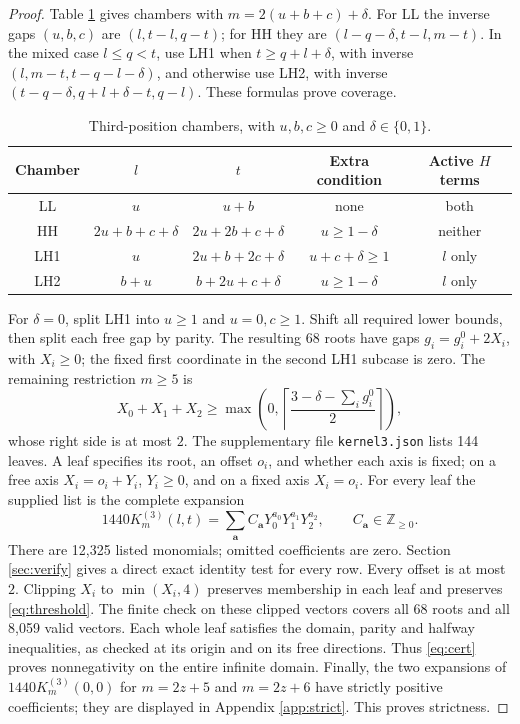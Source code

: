 \documentclass[11pt]{article}
\begin{document}
\begin{proof}
Table \ref{tab:k3} gives chambers with $m=2(u+b+c)+\delta$.
For LL the inverse gaps $(u,b,c)$ are $(l,t-l,q-t)$; for HH they are
$(l-q-\delta,t-l,m-t)$. In the mixed case $l\le q<t$, use LH1 when
$t\ge q+l+\delta$, with inverse $(l,m-t,t-q-l-\delta)$, and otherwise
use LH2, with inverse $(t-q-\delta,q+l+\delta-t,q-l)$.
These formulas prove coverage.
\begin{table}[ht]
\centering\small
\begin{tabular}{c c c c c}
\toprule
Chamber & $l$ & $t$ & Extra condition & Active $H$ terms\\\midrule
LL & $u$ & $u+b$ & none & both\\
HH & $2u+b+c+\delta$ & $2u+2b+c+\delta$ & $u\ge1-\delta$ & neither\\
LH1 & $u$ & $2u+b+2c+\delta$ & $u+c+\delta\ge1$ & $l$ only\\
LH2 & $b+u$ & $b+2u+c+\delta$ & $u\ge1-\delta$ & $l$ only\\\bottomrule
\end{tabular}
\caption{Third-position chambers, with $u,b,c\ge0$ and
$\delta\in\{0,1\}$.}\label{tab:k3}
\end{table}

For $\delta=0$, split LH1 into $u\ge1$ and $u=0,c\ge1$.
Shift all required lower bounds, then split each free gap by parity.
The resulting 68 roots have gaps $g_i=g_i^0+2X_i$, with $X_i\ge0$;
the fixed first coordinate in the second LH1 subcase is zero.
The remaining restriction $m\ge5$ is
\begin{equation}\label{eq:threshold}
 X_0+X_1+X_2\ge
 \max\left(0,\left\lceil\frac{3-\delta-\sum_i g_i^0}{2}\right\rceil\right),
\end{equation}
whose right side is at most $2$.
The supplementary file \texttt{kernel3.json} lists 144 leaves. A leaf
specifies its root, an offset $o_i$, and whether each axis is fixed;
on a free axis $X_i=o_i+Y_i$, $Y_i\ge0$, and on a fixed axis $X_i=o_i$.
For every leaf the supplied list is the complete expansion
\begin{equation}\label{eq:cert}
 1440K^{(3)}_m(l,t)=\sum_{\boldsymbol a}
 C_{\boldsymbol a}Y_0^{a_0}Y_1^{a_1}Y_2^{a_2},\qquad
 C_{\boldsymbol a}\in\mathbb Z_{\ge0}.
\end{equation}
There are 12,325 listed monomials; omitted coefficients are zero.
Section \ref{sec:verify} gives a direct exact identity test for every row.
Every offset is at most $2$. Clipping $X_i$ to $\min(X_i,4)$ preserves
membership in each leaf and preserves \eqref{eq:threshold}.
The finite check on these clipped vectors covers all 68 roots and all
8,059 valid vectors. Each whole leaf satisfies the domain, parity and
halfway inequalities, as checked at its origin and on its free directions.
Thus \eqref{eq:cert} proves nonnegativity on the entire infinite domain.
Finally, the two expansions of $1440K^{(3)}_m(0,0)$ for $m=2z+5$ and
$m=2z+6$ have strictly positive coefficients; they are displayed in
Appendix \ref{app:strict}. This proves strictness.
\end{proof}
\end{document}
